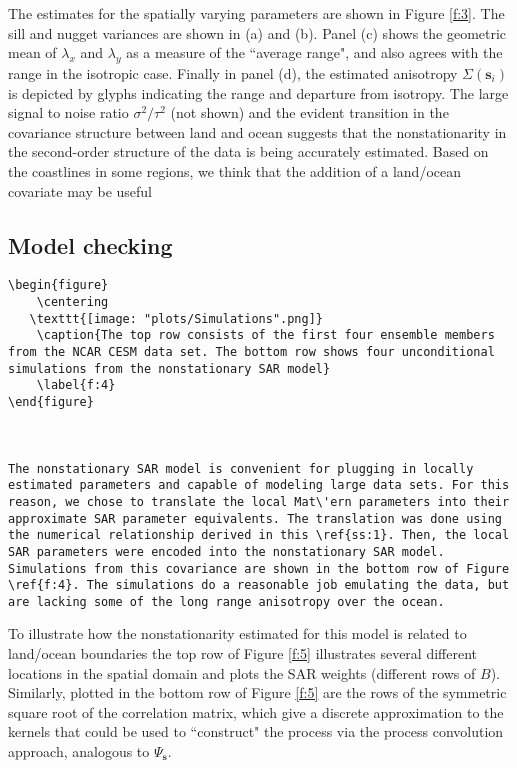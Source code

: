 \documentclass[review]{elsarticle}
\begin{document}
The estimates for the spatially varying parameters are shown in Figure \ref{f:3}. The sill and nugget variances are shown in (a) and (b). Panel (c) shows the geometric mean of $\lambda_x$ and $\lambda_y$ as a measure of the ``average range", and also agrees with the range in the isotropic case. Finally in panel (d), the estimated anisotropy  $\Sigma(\mathbf s_i)$ is depicted  by glyphs indicating the range and departure from isotropy. 
The large signal to noise ratio $\sigma^2/\tau^2$ (not shown) and the evident transition in the covariance structure between land and ocean suggests that the nonstationarity in the second-order structure of the data is being accurately estimated. Based on the coastlines in some regions, we think that the addition of a land/ocean covariate may be useful 



\subsection{Model checking}

\begin{verbatim}
\begin{figure}
    \centering 
   \texttt{[image: "plots/Simulations".png]}
    \caption{The top row consists of the first four ensemble members from the NCAR CESM data set. The bottom row shows four unconditional simulations from the nonstationary SAR model}
    \label{f:4}
\end{figure}



The nonstationary SAR model is convenient for plugging in locally estimated parameters and capable of modeling large data sets. For this reason, we chose to translate the local Mat\'ern parameters into their approximate SAR parameter equivalents. The translation was done using the numerical relationship derived in this \ref{ss:1}. Then, the local SAR parameters were encoded into the nonstationary SAR model. Simulations from this covariance are shown in the bottom row of Figure \ref{f:4}. The simulations do a reasonable job emulating the data, but are lacking some of the long range anisotropy over the ocean.
\end{verbatim}

To illustrate  how the nonstationarity estimated for this model is related to land/ocean  boundaries  the top row of Figure \ref{f:5} illustrates several different locations in the spatial domain and plots the SAR weights (different rows of $B$). Similarly, plotted in the bottom row of Figure \ref{f:5} are the rows of the symmetric square root of the correlation matrix, which give a discrete approximation to the kernels that could be used to ``construct" the process via the process convolution approach, analogous to $ \Psi_{\mathbf{s}}$. 
\end{document}
